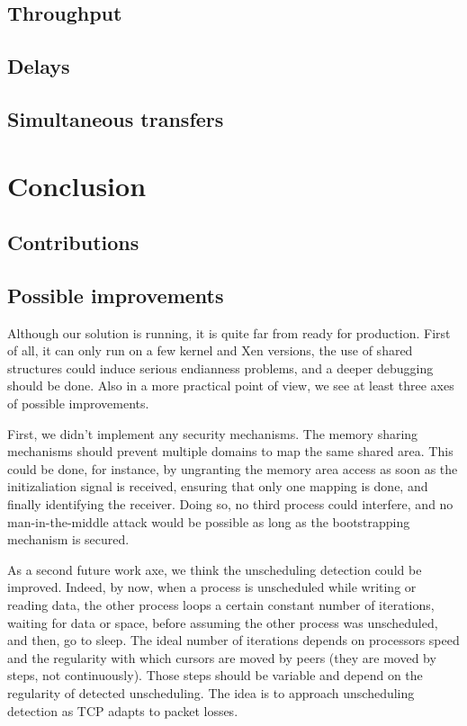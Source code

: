 \documentclass[journal]{IEEEtran}
\begin{document}
\subsection{Throughput}





\subsection{Delays}

\subsection{Simultaneous transfers}






\section{Conclusion}

\subsection{Contributions}


\subsection{Possible improvements}

Although our solution is running, it is quite far from ready for production. First of all, it can only run on a few kernel and Xen versions, the use of shared structures could induce serious endianness problems, and a deeper debugging should be done. Also in a more practical point of view, we see at least three axes of possible improvements.

First, we didn't implement any security mechanisms. The memory sharing mechanisms should prevent multiple domains to map the same shared area. This could be done, for instance, by ungranting the memory area access as soon as the initizaliation signal is received, ensuring that only one mapping is done, and finally identifying the receiver. Doing so, no third process could interfere, and no man-in-the-middle attack would be possible as long as the bootstrapping mechanism is secured. 

As a second future work axe, we think the unscheduling detection could be improved. Indeed, by now, when a process is unscheduled while writing or reading data, the other process loops a certain constant number of iterations, waiting for data or space, before assuming the other process was unscheduled, and then, go to sleep. The ideal number of iterations depends on processors speed and the regularity with which cursors are moved by peers (they are moved by steps, not continuously). Those steps should be variable and depend on the regularity of detected unscheduling. The idea is to approach unscheduling detection as TCP adapts to packet losses. 
\end{document}
